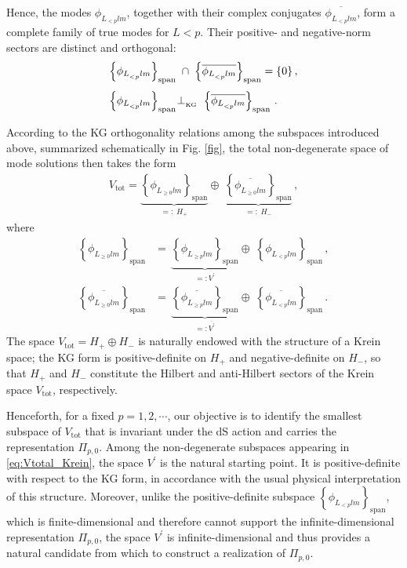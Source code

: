 \documentclass[aps,twocolumn,nofootinbib]{revtex4}
\begin{document}
Hence, the modes $\phi_{L^{}_{<p}lm}$, together with their complex conjugates $\overline{\phi_{L^{}_{<p}lm}}$, form a complete family of true modes for $L<p$. Their positive- and negative-norm sectors are distinct and orthogonal:
\begin{align}
    \left\{\phi_{L^{}_{<p}lm}\right\}_{\mathrm{span}} \;&\cap\; \left\{\overline{\phi_{L^{}_{<p}lm}}\right\}_{\mathrm{span}} = \{0\} \,, \label{direcsum2} \\[3pt]
    \left\{\phi_{L^{}_{<p}lm}\right\}_{\mathrm{span}} \;&\!\!\!\perp_{\vphantom{}_{\text{KG}}} \;\left\{\overline{\phi_{L^{}_{<p}lm}}\right\}_{\mathrm{span}}\,. \label{direcsum1}
\end{align}

According to the KG orthogonality relations among the subspaces introduced above, summarized schematically in Fig. \ref{fig}, the total non-degenerate space of mode solutions then takes the form
\begin{align}\label{eq:Vtotal_Krein}
    V_{\text{tot}} = \underbrace{\left\{ \phi^{}_{L^{}_{\geqslant 0}lm} \right\}_{\mathrm{span}}}_{=:\; H_+} 
    \oplus\;\underbrace{\left\{ \overline{\phi^{}_{L^{}_{\geqslant 0}lm}} \right\}_{\mathrm{span}}}_{=:\; H_-}\,,
\end{align}
where
\begin{align} 
    \left\{ \phi^{}_{L^{}_{\geqslant 0}lm} \right\}_{\mathrm{span}} &=\, \underbrace{\left\{ \phi_{L^{}_{\geqslant p}lm} \right\}_{\mathrm{span}}}_{=:V^\prime} \oplus\; \left\{\phi^{}_{L^{}_{<p}lm}\right\}_{\mathrm{span}} \,, \label{Hilbert}\\[3pt]
    \left\{ \overline{\phi^{}_{L^{}_{\geqslant 0}lm}} \right\}_{\mathrm{span}} &=\, \underbrace{\left\{ \overline{\phi_{L^{}_{\geqslant p}lm}} \right\}_{\mathrm{span}}}_{=:\overline{V^\prime}} \oplus\; \left\{\overline{\phi^{}_{L^{}_{<p}lm}}\right\}_{\mathrm{span}} \,. \label{Anti-Hilbert}
\end{align}
The space $V_{\text{tot}} = H_{+} \oplus H_{-}$ is naturally endowed with the structure of a Krein space; the KG form is positive-definite on $H_{+}$ and negative-definite on $H_{-}$, so that $H_{+}$ and $H_{-}$ constitute the Hilbert and anti-Hilbert sectors of the Krein space $V_{\text{tot}}$, respectively.

Henceforth, for a fixed $p=1,2,\cdots$, our objective is to identify the smallest subspace of $V_{\text{tot}}$ that is invariant under the dS action and carries the representation $\Pi_{p,0}$. Among the non-degenerate subspaces appearing in \eqref{eq:Vtotal_Krein}, the space $V^\prime$ is the natural starting point. It is positive-definite with respect to the KG form, in accordance with the usual physical interpretation of this structure. Moreover, unlike the positive-definite subspace $\left\{\phi^{}_{L^{}_{<p}lm}\right\}_{\mathrm{span}}$, which is finite-dimensional and therefore cannot support the infinite-dimensional representation $\Pi_{p,0}$, the space $V^\prime$ is infinite-dimensional and thus provides a natural candidate from which to construct a realization of $\Pi_{p,0}$.
\end{document}
